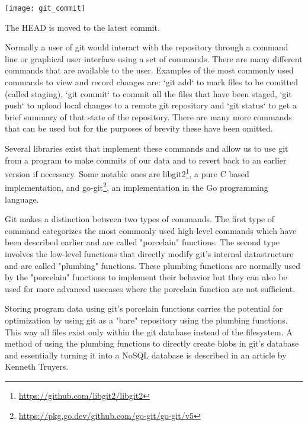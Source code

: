 \begin{marginfigure}
	\centering
	\texttt{[image: git\_commit]}
	\caption{The HEAD is moved to the latest commit.}
	\label{fig:gitcommit}
\end{marginfigure}

Normally a user of git would interact with the repository through a command line or graphical user interface using a set of commands.
There are many different commands that are available to the user.
Examples of the most commonly used commands to view and record changes are: `git add` to mark files to be comitted (called staging), `git commit` to commit all the files that have been staged, `git push` to upload local changes to a remote git repository and `git status` to get a brief summary of that state of the repository. There are many more commands that can be used but for the purposes of brevity these have been omitted.

Several libraries exist that implement these commands and allow us to use git from a program to make commits of our data and to revert back to an earlier version if necessary.
Some notable ones are libgit2\footnote{\url{https://github.com/libgit2/libgit2}}, a pure C based implementation, and go-git\footnote{\url{https://pkg.go.dev/github.com/go-git/go-git/v5}}, an implementation in the Go programming language.

Git makes a distinction between two types of commands.
The first type of command categorizes the most commonly used high-level commands which have been described earlier and are called "porcelain" functions.
The second type involves the low-level functions that directly modify git's internal datastructure and are called "plumbing" functions.
These plumbing functions are normally used by the "porcelain" functions to implement their behavior but they can also be used for more advanced usecases where the porcelain function are not sufficient.

Storing program data using git's porcelain functions carries the potential for optimization by using git as a "bare" repository using the plumbing functions.
This way all files exist only within the git database instead of the filesystem.
A method of using the plumbing functions to directly create blobs in git's database and essentially turning it into a NoSQL database is described in an article by Kenneth Truyers\cite{truyers_git_2016}.


